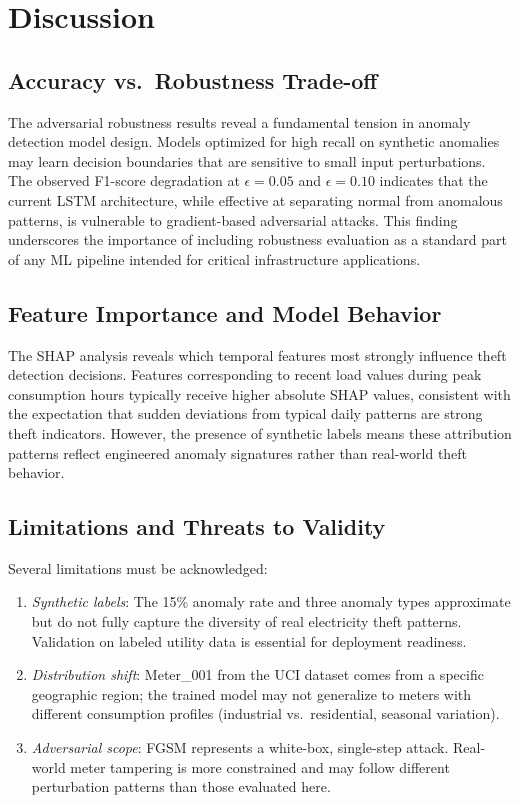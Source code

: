 \documentclass[journal]{IEEEtran}
\begin{document}
\section{Discussion}
\subsection{Accuracy vs.~Robustness Trade-off}
The adversarial robustness results reveal a fundamental tension in anomaly detection model design. Models optimized for high recall on synthetic anomalies may learn decision boundaries that are sensitive to small input perturbations. The observed F1-score degradation at $\epsilon = 0.05$ and $\epsilon = 0.10$ indicates that the current LSTM architecture, while effective at separating normal from anomalous patterns, is vulnerable to gradient-based adversarial attacks. This finding underscores the importance of including robustness evaluation as a standard part of any ML pipeline intended for critical infrastructure applications.

\subsection{Feature Importance and Model Behavior}
The SHAP analysis reveals which temporal features most strongly influence theft detection decisions. Features corresponding to recent load values during peak consumption hours typically receive higher absolute SHAP values, consistent with the expectation that sudden deviations from typical daily patterns are strong theft indicators. However, the presence of synthetic labels means these attribution patterns reflect engineered anomaly signatures rather than real-world theft behavior.

\subsection{Limitations and Threats to Validity}
Several limitations must be acknowledged:
\begin{enumerate}
    \item \textit{Synthetic labels}: The 15\% anomaly rate and three anomaly types approximate but do not fully capture the diversity of real electricity theft patterns. Validation on labeled utility data is essential for deployment readiness.
    \item \textit{Distribution shift}: Meter\_001 from the UCI dataset comes from a specific geographic region; the trained model may not generalize to meters with different consumption profiles (industrial vs.~residential, seasonal variation).
    \item \textit{Adversarial scope}: FGSM represents a white-box, single-step attack. Real-world meter tampering is more constrained and may follow different perturbation patterns than those evaluated here.
\end{enumerate}
\end{document}
